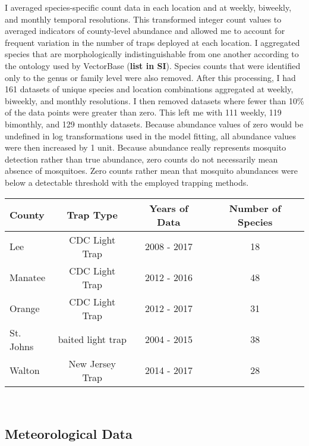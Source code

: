 I averaged species-specific count data in each location and at weekly, biweekly, and monthly temporal resolutions. This transformed integer count values to averaged indicators of county-level abundance and allowed me to account for frequent variation in the number of traps deployed at each location. I aggregated species that are morphologically indistinguishable from one another according to the ontology used by VectorBase (\textbf{list in SI}). Species counts that were identified only to the genus or family level were also removed. After this processing, I had 161 datasets of unique species and location combinations aggregated at weekly, biweekly, and monthly resolutions. I then removed datasets where fewer than 10\% of the data points were greater than zero. This left me with 111 weekly, 119 bimonthly, and 129 monthly datasets. Because abundance values of zero would be undefined in log transformations used in the model fitting, all abundance values were then increased by 1 unit. Because abundance really represents mosquito detection rather than true abundance, zero counts do not necessarily mean absence of mosquitoes. Zero counts rather mean that mosquito abundances were below a detectable threshold with the employed trapping methods.

\begin{center}
	\begin{tabularx}{7in}{ | L{0.5} | C{0.5} | C{0.5} | C{0.5} |}
		\hline
		\textbf{County} & \textbf{Trap Type} &\textbf{Years of Data} & \textbf{Number of Species}\\\hline
		Lee & CDC Light Trap & 2008 - 2017 & 18\\
		Manatee & CDC Light Trap & 2012 - 2016 & 48\\
		Orange & CDC Light Trap & 2012 - 2017 & 31\\
		St. Johns & baited light trap & 2004 - 2015 & 38\\
		Walton & New Jersey Trap & 2014 - 2017 & 28\\\hline 
	\end{tabularx}\\
\end{center}	

\subsection{Meteorological Data}

